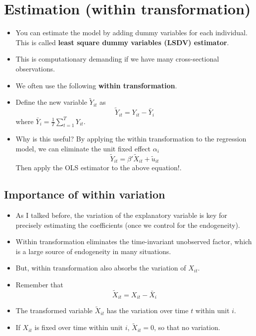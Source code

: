 \documentclass[]{book}
\providecommand{\tightlist}{%
  \setlength{\itemsep}{0pt}\setlength{\parskip}{0pt}}
\begin{document}
\section{Estimation (within
transformation)}\label{estimation-within-transformation}

\begin{itemize}
\tightlist
\item
  You can estimate the model by adding dummy variables for each
  individual. This is called \textbf{least square dummy variables (LSDV)
  estimator}.
\item
  This is computationary demanding if we have many cross-sectional
  observations.
\item
  We often use the following \textbf{within transformation}.
\item
  Define the new variable \(\tilde{Y}_{it}\) as \[
  \tilde{Y}_{it} = Y_{it} - \bar{Y}_i
  \] where \(\bar{Y}_i = \frac{1}{T} \sum_{t=1}^T Y_{it}\).
\item
  Why is this useful? By applying the within transformation to the
  regression model, we can eliminate the unit fixed effect \(\alpha_i\)
  \[
  \tilde{Y}_{it} = \beta' \tilde{X}_{it} + \tilde{u}_{it}
  \] Then apply the OLS estimator to the above equation!.
\end{itemize}

\subsection{Importance of within
variation}\label{importance-of-within-variation}

\begin{itemize}
\tightlist
\item
  As I talked before, the variation of the explanatory variable is key
  for precisely estimating the coefficients (once we control for the
  endogeneity).
\item
  Within transformation eliminates the time-invariant unobserved factor,
  which is a large source of endogeneity in many situations.
\item
  But, within transformation also absorbs the variation of \(X_{it}\).
\item
  Remember that \[
  \tilde{X}_{it} = X_{it} - \bar{X}_i
  \]
\item
  The transformed variable \(\tilde{X}_{it}\) has the variation over
  time \(t\) within unit \(i\).
\item
  If \(X_{it}\) is fixed over time within unit \(i\),
  \(\tilde{X}_{it} = 0\), so that no variation.
\end{itemize}
\end{document}
